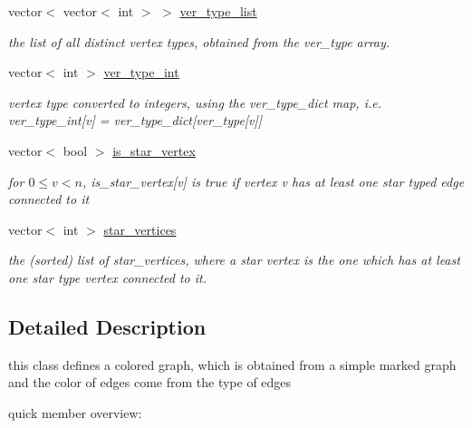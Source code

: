 \begin{DoxyCompactItemize}
vector$<$ vector$<$ int $>$ $>$ \hyperlink{classcolored__graph_a3a1ae8abac458d20a2afb4aa48bbc956}{ver\+\_\+type\+\_\+list}
\begin{DoxyCompactList}\small\item\em the list of all distinct vertex types, obtained from the ver\+\_\+type array. \end{DoxyCompactList}\item 
vector$<$ int $>$ \hyperlink{classcolored__graph_a491ed2ea1a65118af02ec606c8d44c0a}{ver\+\_\+type\+\_\+int}
\begin{DoxyCompactList}\small\item\em vertex type converted to integers, using the ver\+\_\+type\+\_\+dict map, i.\+e. ver\+\_\+type\+\_\+int\mbox{[}v\mbox{]} = ver\+\_\+type\+\_\+dict\mbox{[}ver\+\_\+type\mbox{[}v\mbox{]}\mbox{]} \end{DoxyCompactList}\item 
vector$<$ bool $>$ \hyperlink{classcolored__graph_ad41163e970530c7e45878d299f0dc961}{is\+\_\+star\+\_\+vertex}
\begin{DoxyCompactList}\small\item\em for $0 \leq v < n$, is\+\_\+star\+\_\+vertex\mbox{[}v\mbox{]} is true if vertex v has at least one star typed edge connected to it \end{DoxyCompactList}\item 
vector$<$ int $>$ \hyperlink{classcolored__graph_ab7ee8d717abde7ad7467ef695038f574}{star\+\_\+vertices}
\begin{DoxyCompactList}\small\item\em the (sorted) list of star\+\_\+vertices, where a star vertex is the one which has at least one star type vertex connected to it. \end{DoxyCompactList}\end{DoxyCompactItemize}


\subsection{Detailed Description}
this class defines a colored graph, which is obtained from a simple marked graph and the color of edges come from the type of edges 

quick member overview\+:


